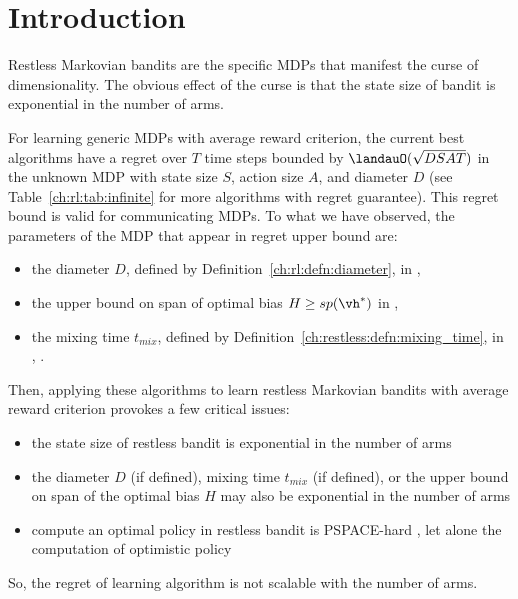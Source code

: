 \section{Introduction}
\label{ch:restless:related}

Restless Markovian bandits are the specific MDPs that manifest the curse of dimensionality.
The obvious effect of the curse is that the state size of bandit is exponential in the number of arms.

For learning generic MDPs with average reward criterion, the current best algorithms have a regret over $T$ time steps bounded by $\landauO(\sqrt{DSAT})$ in the unknown MDP with state size $S$, action size $A$, and diameter $D$ (see Table~\ref{ch:rl:tab:infinite} for more algorithms with regret guarantee).
This regret bound is valid for communicating MDPs.
To what we have observed, the parameters of the MDP that appear in regret upper bound are:
\begin{itemize}
    \item the diameter $D$, defined by Definition~\ref{ch:rl:defn:diameter}, in \eg, \cite{jaksch2010near, fruit2020improved, tossou2019near}
    \item the upper bound on span of optimal bias $H\ge sp(\vh^*)$ in \eg, \cite{bartlett2012regal, ouyang2017learning, fruit2018efficient, zhang2019regret}
    \item the mixing time $t_{mix}$, defined by Definition~\ref{ch:restless:defn:mixing_time}, in \eg, \cite{ortner2020regret}.
\end{itemize}
Then, applying these algorithms to learn restless Markovian bandits with average reward criterion provokes a few critical issues:
\begin{itemize}
    \item the state size of restless bandit is exponential in the number of arms
    \item the diameter $D$ (if defined), mixing time $t_{mix}$ (if defined), or the upper bound on span of the optimal bias $H$ may also be exponential in the number of arms
    \item compute an optimal policy in restless bandit is PSPACE-hard \cite{papadimitriou1994complexity}, let alone the computation of optimistic policy
\end{itemize}
So, the regret of learning algorithm is not scalable with the number of arms.

